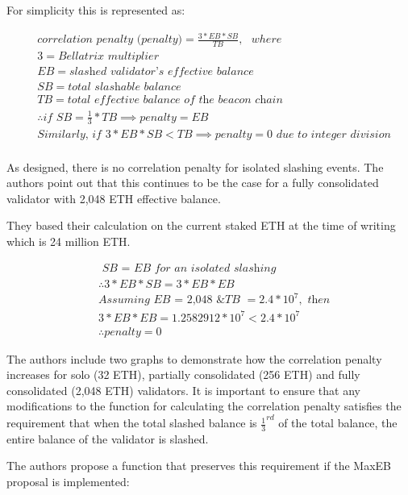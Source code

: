\documentclass[UTF8]{article}
\begin{document}
For simplicity this is represented as:

\begin{equation*}
\begin{split}
& \textit{correlation penalty (penalty)} = \frac{3*EB*SB}{TB}, \texttt{ } where \\
& 3 = \textit{Bellatrix multiplier} \\
& EB = \textit{slashed validator's effective balance} \\
& SB = \textit{total slashable balance} \\
& TB = \textit{total effective balance of the beacon chain} \\
& \therefore \textit{if SB} = \frac{1}{3} * TB \implies penalty = EB \\
& \textit{Similarly, if } 3*EB*SB <  TB \implies penalty = 0 \textit{ due to integer division} \\
\end{split}
\end{equation*}

As designed, there is no correlation penalty for isolated slashing events. The authors point out that this continues to be the case for a fully consolidated validator with 2,048 ETH effective balance.

They based their calculation on the current staked ETH at the time of writing which is 24 million ETH.

\begin{equation*}
\begin{split}
& \textit{ SB = EB for an isolated slashing} \\
& \therefore  3*EB*SB =  3*EB*EB \\
& \textit{Assuming EB = 2,048 \& TB } = 2.4 * 10^7, \textit{ then} \\
& 3*EB*EB = 1.2582912 * 10^7 < 2.4 * 10^7 \\
& \therefore penalty = 0
\end{split}
\end{equation*}

The authors include two graphs to demonstrate how the correlation penalty increases for solo (32 ETH), partially consolidated (256 ETH) and fully consolidated (2,048 ETH) validators. It is important to ensure that any modifications to the function for calculating the correlation penalty satisfies the requirement that when the total slashed balance is $\frac{1}{3}^{rd}$ of the total balance, the entire balance of the validator is slashed.

The authors propose a function that preserves this requirement if the MaxEB proposal is implemented:
\end{document}
